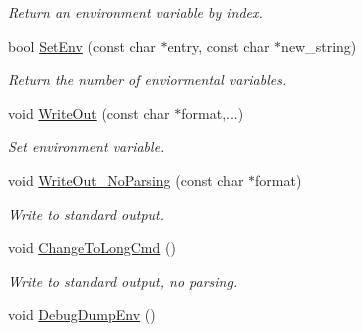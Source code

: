 \begin{DoxyCompactItemize}
\begin{DoxyCompactList}\small\item\em Return an environment variable by index. \end{DoxyCompactList}\item 
\hypertarget{classProgram_a8a7d72f5c08f644fb19e5f36dc1c3d46}{bool \hyperlink{classProgram_a8a7d72f5c08f644fb19e5f36dc1c3d46}{Set\-Env} (const char $\ast$entry, const char $\ast$new\-\_\-string)}\label{classProgram_a8a7d72f5c08f644fb19e5f36dc1c3d46}

\begin{DoxyCompactList}\small\item\em Return the number of enviormental variables. \end{DoxyCompactList}\item 
\hypertarget{classProgram_af3326c2431db683c8cbfcf1a4eb06f71}{void \hyperlink{classProgram_af3326c2431db683c8cbfcf1a4eb06f71}{Write\-Out} (const char $\ast$format,...)}\label{classProgram_af3326c2431db683c8cbfcf1a4eb06f71}

\begin{DoxyCompactList}\small\item\em Set environment variable. \end{DoxyCompactList}\item 
\hypertarget{classProgram_aa45498c7e07ec784b72ed166ab69a847}{void \hyperlink{classProgram_aa45498c7e07ec784b72ed166ab69a847}{Write\-Out\-\_\-\-No\-Parsing} (const char $\ast$format)}\label{classProgram_aa45498c7e07ec784b72ed166ab69a847}

\begin{DoxyCompactList}\small\item\em Write to standard output. \end{DoxyCompactList}\item 
\hypertarget{classProgram_a3b124865b50f681fa1d5ae05d71107f8}{void \hyperlink{classProgram_a3b124865b50f681fa1d5ae05d71107f8}{Change\-To\-Long\-Cmd} ()}\label{classProgram_a3b124865b50f681fa1d5ae05d71107f8}

\begin{DoxyCompactList}\small\item\em Write to standard output, no parsing. \end{DoxyCompactList}\item 
\hypertarget{classProgram_a7a253f9ce31472b4b5c38791524f3ba8}{void \hyperlink{classProgram_a7a253f9ce31472b4b5c38791524f3ba8}{Debug\-Dump\-Env} ()}\label{classProgram_a7a253f9ce31472b4b5c38791524f3ba8}


\end{DoxyCompactItemize}
